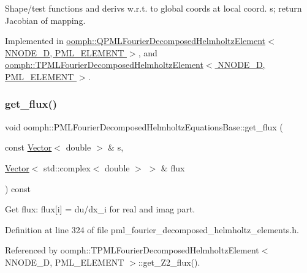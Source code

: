 Shape/test functions and derivs w.\+r.\+t. to global coords at local coord. s; return Jacobian of mapping. 



Implemented in \hyperlink{classoomph_1_1QPMLFourierDecomposedHelmholtzElement_adb66973c00aa3b1b367fdd890e4dfd68}{oomph\+::\+Q\+P\+M\+L\+Fourier\+Decomposed\+Helmholtz\+Element$<$ N\+N\+O\+D\+E\+\_\+D, P\+M\+L\+\_\+\+E\+L\+E\+M\+E\+N\+T $>$}, and \hyperlink{classoomph_1_1TPMLFourierDecomposedHelmholtzElement_a7f93fbda57b10da922c7e1db0698b866}{oomph\+::\+T\+P\+M\+L\+Fourier\+Decomposed\+Helmholtz\+Element$<$ N\+N\+O\+D\+E\+\_\+D, P\+M\+L\+\_\+\+E\+L\+E\+M\+E\+N\+T $>$}.

\mbox{\label{classoomph_1_1PMLFourierDecomposedHelmholtzEquationsBase_a303565df899a7b4ad9e46ce98eade447}} 
\subsubsection{\texorpdfstring{get\+\_\+flux()}{get\_flux()}}
{\footnotesize\ttfamily void oomph\+::\+P\+M\+L\+Fourier\+Decomposed\+Helmholtz\+Equations\+Base\+::get\+\_\+flux (\begin{DoxyParamCaption}\item[{const \hyperlink{classoomph_1_1Vector}{Vector}$<$ double $>$ \&}]{s,  }\item[{\hyperlink{classoomph_1_1Vector}{Vector}$<$ std\+::complex$<$ double $>$ $>$ \&}]{flux }\end{DoxyParamCaption}) const\hspace{0.3cm}{\ttfamily [inline]}}



Get flux\+: flux\mbox{[}i\mbox{]} = du/dx\+\_\+i for real and imag part. 



Definition at line 324 of file pml\+\_\+fourier\+\_\+decomposed\+\_\+helmholtz\+\_\+elements.\+h.



Referenced by oomph\+::\+T\+P\+M\+L\+Fourier\+Decomposed\+Helmholtz\+Element$<$ N\+N\+O\+D\+E\+\_\+D, P\+M\+L\+\_\+\+E\+L\+E\+M\+E\+N\+T $>$\+::get\+\_\+\+Z2\+\_\+flux().

